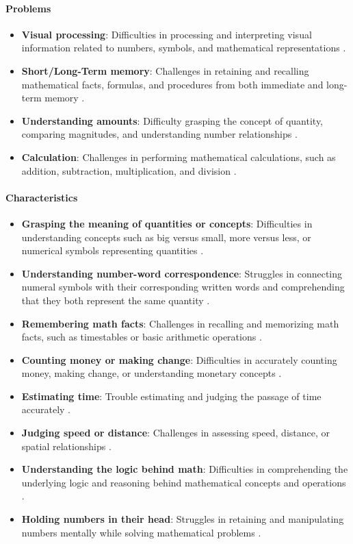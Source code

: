 \paragraph{Problems}
\begin{itemize}
    \item \textbf{Visual processing}: Difficulties in processing and interpreting visual information related to numbers, symbols, and mathematical representations \cite{understood2024}.
    \item \textbf{Short/Long-Term memory}: Challenges in retaining and recalling mathematical facts, formulas, and procedures from both immediate and long-term memory \cite{clevelandclinic2024}.
    \item \textbf{Understanding amounts}: Difficulty grasping the concept of quantity, comparing magnitudes, and understanding number relationships \cite{clevelandclinic2024}.
    \item \textbf{Calculation}: Challenges in performing mathematical calculations, such as addition, subtraction, multiplication, and division \cite{understood2024}.
\end{itemize}

\paragraph{Characteristics}
\begin{itemize}
    \item \textbf{Grasping the meaning of quantities or concepts}: Difficulties in understanding concepts such as big versus small, more versus less, or numerical symbols representing quantities \cite{clevelandclinic2024}.
    \item \textbf{Understanding number-word correspondence}: Struggles in connecting numeral symbols with their corresponding written words and comprehending that they both represent the same quantity \cite{understood2024}.
    \item \textbf{Remembering math facts}: Challenges in recalling and memorizing math facts, such as timestables or basic arithmetic operations \cite{clevelandclinic2024}.
    \item \textbf{Counting money or making change}: Difficulties in accurately counting money, making change, or understanding monetary concepts \cite{clevelandclinic2024}.
    \item \textbf{Estimating time}: Trouble estimating and judging the passage of time accurately \cite{understood2024}.
    \item \textbf{Judging speed or distance}: Challenges in assessing speed, distance, or spatial relationships \cite{pmc2024}.
    \item \textbf{Understanding the logic behind math}: Difficulties in comprehending the underlying logic and reasoning behind mathematical concepts and operations \cite{understood2024}.
    \item \textbf{Holding numbers in their head}: Struggles in retaining and manipulating numbers mentally while solving mathematical problems \cite{clevelandclinic2024}.
\end{itemize}


